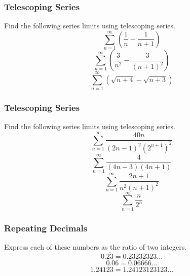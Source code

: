 \documentclass[xcolor=dvipsnames]{beamer}
\begin{document}
\begin{frame}
  \frametitle{Telescoping Series}
{\ubung} Find the following series limits using telescoping series.
\begin{equation}
  \label{eq:ekiesohj}
  \sum_{n=1}^{\infty}\left(\frac{1}{n}-\frac{1}{n+1}\right)
\end{equation}
\begin{equation}
  \label{eq:lohwoquo}
  \sum_{n=1}^{\infty}\left(\frac{3}{n^{2}}-\frac{3}{(n+1)^{2}}\right)
\end{equation}
\begin{equation}
  \label{eq:zaquadao}
  \sum_{n=1}^{\infty}\left(\sqrt{n+4}-\sqrt{n+3}\right)
\end{equation}
\end{frame}

\begin{frame}
  \frametitle{Telescoping Series}
{\ubung} Find the following series limits using telescoping series.
\begin{equation}
  \label{eq:eiphohng}
  \sum_{n=1}^{\infty}\frac{40n}{(2n-1)^{2}(2^{n+1})^{2}}
\end{equation}
\begin{equation}
  \label{eq:ierohghu}
  \sum_{n=1}^{\infty}\frac{4}{(4n-3)(4n+1)}
\end{equation}
\begin{equation}
  \label{eq:uunguexo}
  \sum_{n=1}^{\infty}\frac{2n+1}{n^{2}(n+1)^{2}}
\end{equation}
\begin{equation}
  \label{eq:quaejich}
  \sum_{n=1}^{\infty}\frac{n}{2^{n}}
\end{equation}
\end{frame}

\begin{frame}
  \frametitle{Repeating Decimals}
  Express each of these numbers as the ratio of two integers.
  \begin{equation}
    \label{eq:aijeetha}
    0.\overline{23}=0.23232323{\ldots}
  \end{equation}
  \begin{equation}
    \label{eq:axohthee}
    0.0\overline{6}=0.06666{\ldots}
  \end{equation}
  \begin{equation}
    \label{eq:amoofugh}
    1.24\overline{123}=1.24123123123{\ldots}
  \end{equation}
\end{frame}
\end{document}
